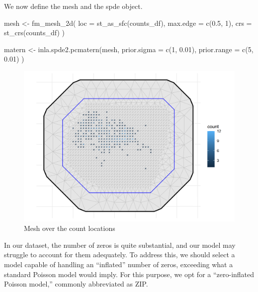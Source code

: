 \documentclass[
  letterpaper,
  DIV=11,
  numbers=noendperiod]{scrartcl}
\newenvironment{Shaded}{\begin{snugshade}}{\end{snugshade}}
\newcommand{\AttributeTok}[1]{\textcolor[rgb]{0.40,0.45,0.13}{#1}}
\newcommand{\DecValTok}[1]{\textcolor[rgb]{0.68,0.00,0.00}{#1}}
\newcommand{\FloatTok}[1]{\textcolor[rgb]{0.68,0.00,0.00}{#1}}
\newcommand{\FunctionTok}[1]{\textcolor[rgb]{0.28,0.35,0.67}{#1}}
\newcommand{\NormalTok}[1]{\textcolor[rgb]{0.00,0.23,0.31}{#1}}
\newcommand{\OtherTok}[1]{\textcolor[rgb]{0.00,0.23,0.31}{#1}}
\begin{document}
We now define the mesh and the spde object.

\begin{Shaded}
\begin{Highlighting}[]

\NormalTok{mesh }\OtherTok{\textless{}{-}} \FunctionTok{fm\_mesh\_2d}\NormalTok{(}
  \AttributeTok{loc =} \FunctionTok{st\_as\_sfc}\NormalTok{(counts\_df),}
  \AttributeTok{max.edge =} \FunctionTok{c}\NormalTok{(}\FloatTok{0.5}\NormalTok{, }\DecValTok{1}\NormalTok{),}
  \AttributeTok{crs =} \FunctionTok{st\_crs}\NormalTok{(counts\_df)}
\NormalTok{)}

\NormalTok{matern }\OtherTok{\textless{}{-}} \FunctionTok{inla.spde2.pcmatern}\NormalTok{(mesh,}
  \AttributeTok{prior.sigma =} \FunctionTok{c}\NormalTok{(}\DecValTok{1}\NormalTok{, }\FloatTok{0.01}\NormalTok{),}
  \AttributeTok{prior.range =} \FunctionTok{c}\NormalTok{(}\DecValTok{5}\NormalTok{, }\FloatTok{0.01}\NormalTok{)}
\NormalTok{)}
\end{Highlighting}
\end{Shaded}

\begin{figure}[H]

{\centering \includegraphics[width=0.8\linewidth,height=\textheight,keepaspectratio]{day5_practical_8_files/figure-pdf/unnamed-chunk-69-1.png}

}

\caption{Mesh over the count locations}

\end{figure}%

In our dataset, the number of zeros is quite substantial, and our model
may struggle to account for them adequately. To address this, we should
select a model capable of handling an ``inflated'' number of zeros,
exceeding what a standard Poisson model would imply. For this purpose,
we opt for a ``zero-inflated Poisson model,'' commonly abbreviated as
ZIP.
\end{document}
